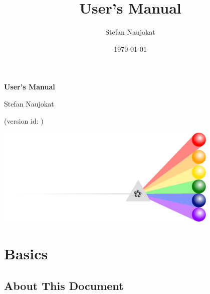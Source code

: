 \documentclass[a4paper,american,12pt]{scrreprt}
\begin{document}
\title{\cinco User's Manual}
\author{Stefan Naujokat}
\date{\today}

\begin{titlepage}

\vspace*{3cm}

\makebox[2.5cm]{}
\begin{minipage}{8.0cm}
\begin{center}
	{\huge\bfseries \cinco{} User's Manual}

	\vspace{1.5em}

	{\large Stefan Naujokat}

	\vspace{1.5em}

	{\large (version id: \gitAbbrevHash{})}
\end{center}
 \end{minipage}

\vspace{-4em}

\includegraphics[width=0.8\textwidth]{figures/cinco-logo.pdf}

\vfill
\end{titlepage}

\chapter{Basics}

\section{About This Document}
\end{document}
